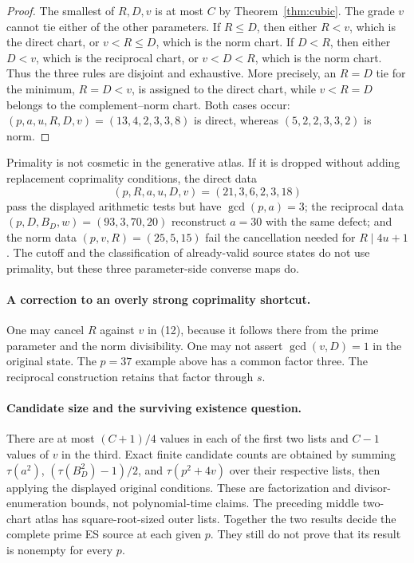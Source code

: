 \begin{proof}
The smallest of $R,D,v$ is at most $C$ by Theorem~\ref{thm:cubic}.
The grade $v$ cannot tie either of the other parameters.  If $R\le D$, then
either $R<v$, which is the direct chart, or $v<R\le D$, which is the norm
chart.  If $D<R$, then either $D<v$, which is the reciprocal chart, or
$v<D<R$, which is the norm chart.  Thus the three rules are disjoint and
exhaustive.  More precisely, an $R=D$ tie for the minimum, $R=D<v$, is
assigned to the direct chart, while $v<R=D$ belongs to the complement--norm
chart.  Both cases occur: $(p,a,u,R,D,v)=(13,4,2,3,3,8)$ is direct, whereas
$(5,2,2,3,3,2)$ is norm.
\end{proof}

Primality is not cosmetic in the generative atlas.  If it is dropped without
adding replacement coprimality conditions, the direct data
\[
 (p,R,a,u,D,v)=(21,3,6,2,3,18)
\]
pass the displayed arithmetic tests but have $\gcd(p,a)=3$; the reciprocal
data $(p,D,B_D,w)=(93,3,70,20)$ reconstruct $a=30$ with the same defect; and
the norm data $(p,v,R)=(25,5,15)$ fail the cancellation needed for
$R\mid4u+1$.  The cutoff and the classification of already-valid source
states do not use primality, but these three parameter-side converse maps do.

\paragraph{A correction to an overly strong coprimality shortcut.}
One may cancel $R$ against $v$ in (12), because it follows there from the
prime parameter and the norm divisibility. One may not assert
$\gcd(v,D)=1$ in the original state. The $p=37$ example above has a common
factor three. The reciprocal construction retains that factor through $s$.

\paragraph{Candidate size and the surviving existence question.}
There are at most $(C+1)/4$ values in each of the first two lists and $C-1$
values of $v$ in the third. Exact finite candidate counts are obtained by summing
$\tau(a^2)$, $(\tau(B_D^2)-1)/2$, and $\tau(p^2+4v)$ over their respective
lists, then applying the displayed original conditions. These are factorization
and divisor-enumeration bounds, not polynomial-time claims. The preceding
middle two-chart atlas has square-root-sized outer lists. Together the two
results decide the complete prime ES source at each given $p$. They still do
not prove that its result is nonempty for every $p$.


